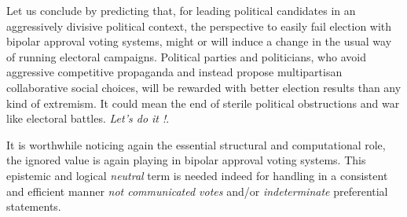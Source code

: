 Let us conclude by predicting that, for leading political candidates in an aggressively divisive political context, the perspective to easily fail election with bipolar approval voting systems, might or will induce a change in the usual way of running electoral campaigns. Political parties and politicians, who avoid aggressive competitive propaganda and instead propose multipartisan collaborative social choices, will be rewarded with better election results than any kind of extremism. It could mean the end of sterile political obstructions and war like electoral battles. \emph{Let's do it !}.

It is worthwhile noticing again the essential structural and computational role, the ignored value is again playing in bipolar approval voting systems. This epistemic and logical \emph{neutral} term is needed indeed for handling in a consistent and efficient manner \emph{not communicated votes} and/or \emph{indeterminate} preferential statements.
 
\clearpage


%